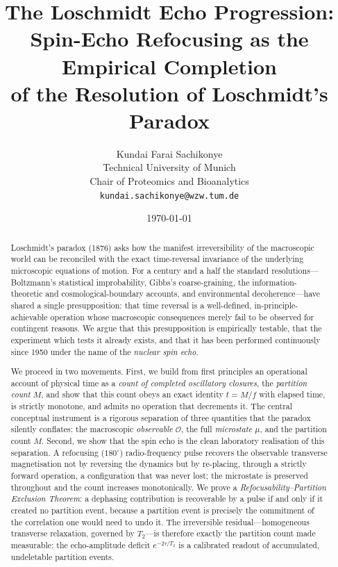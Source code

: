 \documentclass[11pt,a4paper]{article}
\title{\textbf{The Loschmidt Echo Progression:\\[2pt]
Spin-Echo Refocusing as the Empirical Completion\\
of the Resolution of Loschmidt's Paradox}}
\author{Kundai Farai Sachikonye\\
Technical University of Munich\\
Chair of Proteomics and Bioanalytics\\
\texttt{kundai.sachikonye@wzw.tum.de}}
\date{\today}
\theoremstyle{thmstyle}
\theoremstyle{definition}
\theoremstyle{remark}
\newcommand{\Ttwo}{T_{2}}
\newcommand{\Obs}{\mathcal{O}}
\newcommand{\Mic}{\mu}
\newcommand{\Count}{M}
\begin{document}
\maketitle

\begin{abstract}
\noindent
Loschmidt's paradox (1876) asks how the manifest irreversibility of the
macroscopic world can be reconciled with the exact time-reversal
invariance of the underlying microscopic equations of motion. For a
century and a half the standard resolutions---Boltzmann's statistical
improbability, Gibbs's coarse-graining, the information-theoretic and
cosmological-boundary accounts, and environmental decoherence---have
shared a single presupposition: that time reversal is a well-defined,
in-principle-achievable operation whose macroscopic consequences merely
fail to be observed for contingent reasons. We argue that this
presupposition is empirically testable, that the experiment which tests
it already exists, and that it has been performed continuously since
1950 under the name of the \emph{nuclear spin echo}.

We proceed in two movements. First, we build from first principles an
operational account of physical time as a \emph{count of completed
oscillatory closures}, the \emph{partition count} $\Count$, and show
that this count obeys an exact identity $t=\Count/f$ with elapsed time,
is strictly monotone, and admits no operation that decrements it. The
central conceptual instrument is a rigorous separation of three
quantities that the paradox silently conflates: the macroscopic
\emph{observable} $\Obs$, the full \emph{microstate} $\Mic$, and the
partition count $\Count$. Second, we show that the spin echo is the
clean laboratory realisation of this separation. A refocusing
($180^{\circ}$) radio-frequency pulse recovers the observable
transverse magnetisation not by reversing the dynamics but by
re-placing, through a strictly forward operation, a configuration that
was never lost; the microstate is preserved throughout and the count
increases monotonically. We prove a \emph{Refocusability--Partition
Exclusion Theorem}: a dephasing contribution is recoverable by a pulse
if and only if it created no partition event, because a partition event
is precisely the commitment of the correlation one would need to undo
it. The irreversible residual---homogeneous transverse relaxation,
governed by $\Ttwo$---is therefore exactly the partition count made
measurable: the echo-amplitude deficit $e^{-2\tau/\Ttwo}$ is a
calibrated readout of accumulated, undeletable partition events.


\end{abstract}
\end{document}
